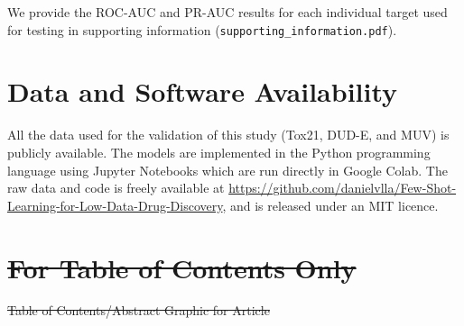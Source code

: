 \documentclass[journal=jcisd8,manuscript=article]{achemso} %
\newenvironment{datasoftware}{%
\section*{Data and Software Availability}%
}{}
\providecommand{\DIFdel}[1]{{\protect\color{red}\sout{#1}}}                      %
\providecommand{\DIFdelbegin}{} %
\providecommand{\DIFdelFL}[1]{\DIFdel{#1}} %
\begin{document}
\begin{suppinfo}

We provide the ROC-AUC and PR-AUC results for each individual target used for testing in supporting information (\texttt{supporting\_information.pdf}).

\end{suppinfo}


\begin{datasoftware}

All the data used for the validation of this study (Tox21, DUD-E, and MUV) is publicly available.  The models are implemented in the Python programming language using Jupyter Notebooks which are run directly in Google Colab.  The raw data and code is freely available at \url{https://github.com/danielvlla/Few-Shot-Learning-for-Low-Data-Drug-Discovery}, and is released under an MIT licence.

\end{datasoftware}

\DIFdelbegin %
\section{\DIFdel{For Table of Contents Only}}
\addtocounter{section}{-1}%

{%
\DIFdelFL{Table of Contents/Abstract Graphic for Article}}
\end{document}
